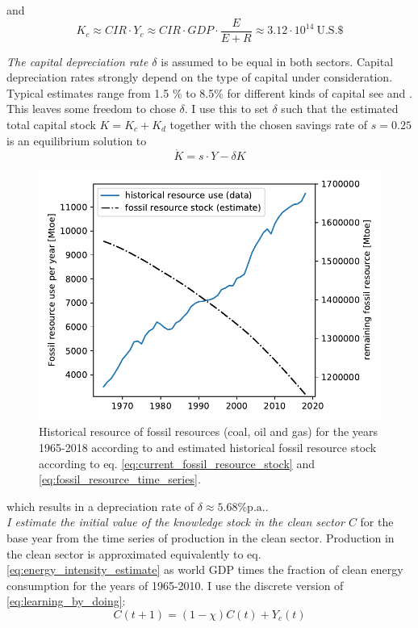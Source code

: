 and 
\begin{equation}
  K_c \approx CIR \cdot Y_c \approx CIR \cdot GDP \cdot \frac{E}{E + R} \approx 3.12 \cdot 10^{14} ~ \textrm{U.S.} \$
  \label{eq:approx_clean_capital}
\end{equation}

\textit{The capital depreciation rate $\delta$} is assumed to be equal in both sectors. Capital depreciation rates strongly depend on the type of capital under consideration. Typical estimates range from 1.5 \% to 8.5\% for different kinds of capital see \cite{Kamps2005} and \cite{Gupta2014}. This leaves some freedom to chose $\delta$. I use this to set $\delta$ such that the estimated total capital stock $K = K_c + K_d$ together with the chosen savings rate of $s=0.25$ is an equilibrium solution to 
\begin{equation}
  \dot{K} = s \cdot Y - \delta K
  \label{eq:delta_estimate}
\end{equation} 
\begin{figure}
	\vspace{-.4 cm}
        \includegraphics[width = .68 \textwidth]{./figures/fossil_resource_per_year.pdf}
        \caption{Historical resource of fossil resources (coal, oil and gas) for the years 1965-2018 according to \cite{dudley2019bp} and estimated historical fossil resource stock according to eq. \ref{eq:current_fossil_resource_stock} and \ref{eq:fossil_resource_time_series}. \label{fig:historical_resource_use}}
\end{figure}
which results in a depreciation rate of $\delta\approx 5.68 \% \mathrm{p.a.}$.\\

\textit{I estimate the initial value of the knowledge stock in the clean sector $C$} for the base year from the time series of production in the clean sector. Production in the clean sector is approximated equivalently to eq. \ref{eq:energy_intensity_estimate} as world GDP times the fraction of clean energy consumption for the years of 1965-2010. I use the discrete version of \eqref{eq:learning_by_doing}:
\begin{equation} 
  C(t+1) = (1-\chi)C(t) + Y_c(t)
  \label{eq:discrete_clean_knowledge}
\end{equation}

